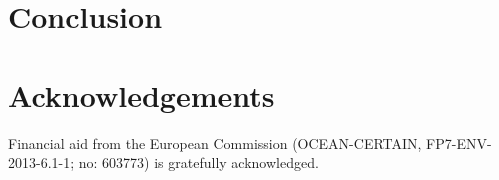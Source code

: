 \documentclass[10pt, a4paper]{article}
\begin{document}
\section{Conclusion}



\section{Acknowledgements}

Financial aid from the European Commission (OCEAN-CERTAIN, FP7-ENV-2013-6.1-1; no: 603773) is gratefully acknowledged. 




\end{document}

